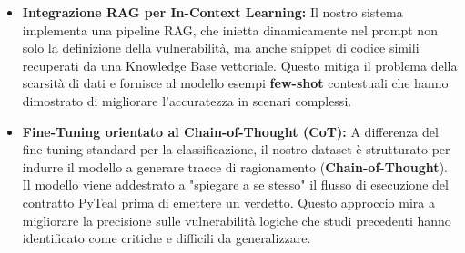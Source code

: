 \begin{itemize}
    \item \textbf{Integrazione RAG per In-Context Learning:} Il nostro sistema implementa una pipeline RAG, che inietta dinamicamente nel prompt non solo la definizione della vulnerabilità, ma anche snippet di codice simili recuperati da una Knowledge Base vettoriale. Questo mitiga il problema della scarsità di dati e fornisce al modello esempi \textbf{few-shot} contestuali che hanno dimostrato di migliorare l'accuratezza in scenari complessi.
    
    \item \textbf{Fine-Tuning orientato al Chain-of-Thought (CoT):} A differenza del fine-tuning standard per la classificazione, il nostro dataset è strutturato per indurre il modello a generare tracce di ragionamento (\textbf{Chain-of-Thought}). Il modello viene addestrato a "spiegare a se stesso" il flusso di esecuzione del contratto PyTeal prima di emettere un verdetto. Questo approccio mira a migliorare la precisione sulle vulnerabilità logiche che studi precedenti hanno identificato come critiche e difficili da generalizzare.
\end{itemize}